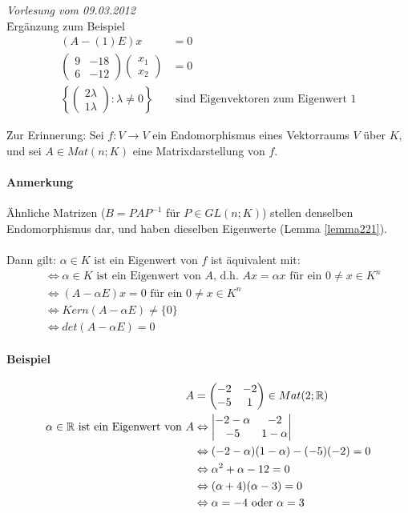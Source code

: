 \newpage
\noindent \textit{Vorlesung vom 09.03.2012} \\
\f{Ergänzung zum Beispiel}
\begin{align}
(A-(1)E)x &= 0 \\
\begin{pmatrix} 9 & -18 \\ 6 & -12 \end{pmatrix} \begin{pmatrix} x_1 \\ x_2 \end{pmatrix} &= 0 \\
\left\{ \begin{pmatrix} 2 \lambda \\ 1 \lambda \end{pmatrix}: \lambda \neq 0 \right\} &\text{ sind Eigenvektoren zum Eigenwert 1}
\end{align}

\f{Zur Erinnerung:}
Sei $f: V \rightarrow V$ ein Endomorphismus eines Vektorraums $V$ über $K$, und sei $A \in Mat(n;K)$ eine Matrixdarstellung von $f$.

\paragraph{Anmerkung}
Ähnliche Matrizen ($B=PAP^{-1}$ für $P \in GL(n;K)$) stellen denselben Endomorphismus dar, und haben dieselben Eigenwerte (Lemma \ref{lemma221}). \\\\
Dann gilt: $\alpha \in K$ ist ein Eigenwert von $f$ ist äquivalent mit:
\begin{align}
&\Leftrightarrow \alpha \in K \text{ ist ein Eigenwert von $A$, d.h. $Ax = \alpha x$ für ein } 0 \neq x \in K^{n} \\
&\Leftrightarrow (A - \alpha E)x = 0 \text{ für ein } 0 \neq x \in K^n \\
&\Leftrightarrow Kern(A - \alpha E) \neq \{0\} \\
&\Leftrightarrow det(A - \alpha E) = 0
\end{align}

\paragraph{Beispiel}
\begin{align}
A &= \begin{pmatrix} -2 & -2 \\ -5 & 1 \end{pmatrix} \in Mat(2; \mathbb{R}) \\
\alpha \in \mathbb{R} \text{ ist ein Eigenwert von } A &\Leftrightarrow \begin{vmatrix} -2- \alpha & -2 \\ -5 & 1-\alpha \end{vmatrix} \\
&\Leftrightarrow (-2-\alpha)(1 - \alpha) - (-5)(-2) = 0 \\
&\Leftrightarrow \alpha^2 + \alpha - 12 = 0 \\
&\Leftrightarrow (\alpha + 4)(\alpha - 3) = 0 \\
&\Leftrightarrow \alpha = -4 \text{ oder } \alpha = 3
\end{align}

